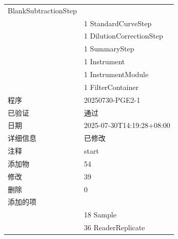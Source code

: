 \documentclass[UTF8,10pt,a4paper,fontset=fandol]{ctexart}
\newcommand{\fieldvalue}[1]{#1}
\begin{document}
\begin{tabular}{ll}
\fieldvalue{BlankSubtractionStep}\\
&
\fieldvalue{1}\quad
\fieldvalue{StandardCurveStep}\\
&
\fieldvalue{1}\quad
\fieldvalue{DilutionCorrectionStep}\\
&
\fieldvalue{1}\quad
\fieldvalue{SummaryStep}\\
&
\fieldvalue{1}\quad
\fieldvalue{Instrument}\\
&
\fieldvalue{1}\quad
\fieldvalue{InstrumentModule}\\
&
\fieldvalue{1}\quad
\fieldvalue{FilterContainer}\\[2pt]

程序 &
\fieldvalue{20250730-PGE2-1}\\
已验证 &
\fieldvalue{通过}\\
日期 &
\fieldvalue{2025-07-30T14:19:28+08:00}\\
详细信息 &
\fieldvalue{已修改}\\
注释 &
\fieldvalue{start}\\[2pt]

添加物 &
\fieldvalue{54}\\
修改 &
\fieldvalue{39}\\
删除 &
\fieldvalue{0}\\[2pt]

\multicolumn{2}{l}{添加的项}\\
&
\fieldvalue{18}\quad
\fieldvalue{Sample}\\
&
\fieldvalue{36}\quad
\fieldvalue{ReaderReplicate}\\[2pt]


\end{tabular}
\end{document}
